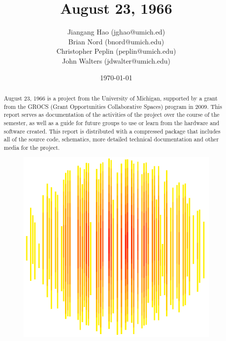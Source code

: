 \documentclass[11pt]{report}
\date{\today}
\begin{document}
\title{August 23, 1966}
\author{
        Jiangang Hao (jghao@umich.ed) \\
        Brian Nord (bnord@umich.edu) \\
        Christopher Peplin (peplin@umich.edu) \\
        John Walters (jdwalter@umich.edu)
}
\maketitle

\begin{abstract}\centering
August 23, 1966 is a project from the University of Michigan, supported by a
grant from the GROCS (Grant Opportunities Collaborative Spaces) program in 2009.
This report serves as documentation of the activities of the project over the
course of the semester, as well as a guide for future groups to use or learn
from the hardware and software created. This report is distributed with a compressed package that includes all of the source code, schematics, more detailed technical documentation and other media for the project.
\begin{figure}\center
\includegraphics[width=.5\textwidth]{images/august_logo_transp.png}
\end{figure}
\end{abstract}

\tableofcontents







\end{document}
